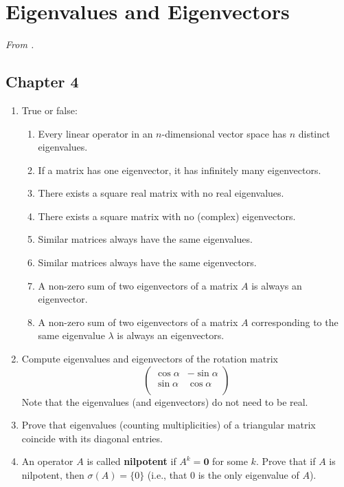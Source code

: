 \documentclass[../psets.tex]{subfiles}
\begin{document}
\section{Eigenvalues and Eigenvectors}
\emph{From \textcite{bib:Treil}.}
\subsection*{Chapter 4}
\begin{enumerate}[label={\textbf{1.\arabic*.}}]
    \item {}True or false:
    \begin{enumerate}
        \item Every linear operator in an $n$-dimensional vector space has $n$ distinct eigenvalues.
        \item If a matrix has one eigenvector, it has infinitely many eigenvectors.
        \item There exists a square real matrix with no real eigenvalues.
        \item There exists a square matrix with no (complex) eigenvectors.
        \item Similar matrices always have the same eigenvalues.
        \item Similar matrices always have the same eigenvectors.
        \item A non-zero sum of two eigenvectors of a matrix $A$ is always an eigenvector.
        \item A non-zero sum of two eigenvectors of a matrix $A$ corresponding to the same eigenvalue $\lambda$ is always an eigenvectors.
    \end{enumerate}
    \item Compute eigenvalues and eigenvectors of the rotation matrix
    \begin{equation*}
        \begin{pmatrix}
            \cos\alpha & -\sin\alpha\\
            \sin\alpha & \cos\alpha\\
        \end{pmatrix}
    \end{equation*}
    Note that the eigenvalues (and eigenvectors) do not need to be real.
    \item Prove that eigenvalues (counting multiplicities) of a triangular matrix coincide with its diagonal entries.
    \item An operator $A$ is called \textbf{nilpotent} if $A^k=\bm{0}$ for some $k$. Prove that if $A$ is nilpotent, then $\sigma(A)=\{0\}$ (i.e., that 0 is the only eigenvalue of $A$).

\end{enumerate}
\end{document}

